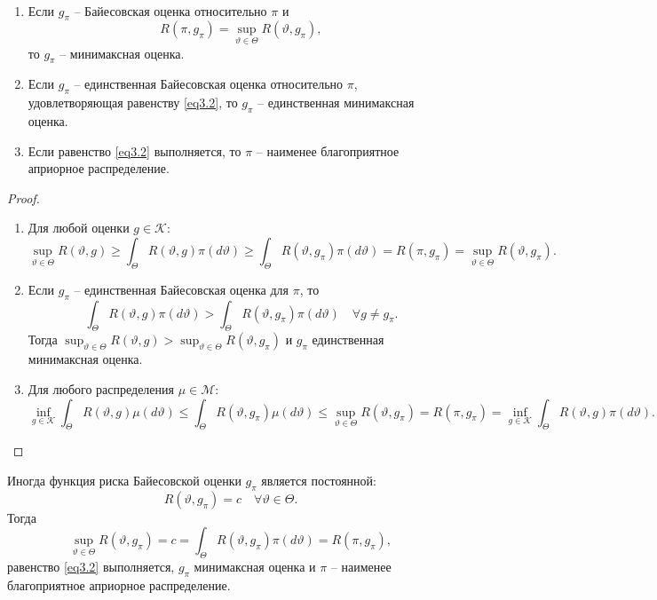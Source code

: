 \begin{thm} \
	\begin{enumerate}
		\item Если $g_\pi$ -- Байесовская оценка относительно $\pi$ и 
		\begin{equation} \label{eq3.2}
		 R(\pi, g_\pi) = \sup_{\vartheta \in \Theta} R(\vartheta, g_\pi),
		\end{equation}
		то $g_\pi$ -- минимаксная оценка.
		\item Если $g_\pi$ -- единственная Байесовская оценка относительно $\pi$, удовлетворяющая равенству \eqref{eq3.2}, то $g_\pi$ -- единственная минимаксная оценка.
		\item Если равенство \eqref{eq3.2} выполняется, то $\pi$ -- наименее благоприятное априорное распределение.
	\end{enumerate}
\end{thm}

\begin{proof} \
	\begin{enumerate}
		\item Для любой оценки $g \in \mathcal{K}$:
		\[ \sup_{\vartheta \in \Theta}R(\vartheta, g) \geq \int_{\Theta}R(\vartheta, g)\pi(d\vartheta) \geq \int_{\Theta}R(\vartheta, g_\pi)\pi(d\vartheta)=R(\pi, g_\pi)=\sup_{\vartheta \in \Theta}R(\vartheta, g_\pi). \]
		\item Если $g_\pi$ -- единственная Байесовская оценка для $\pi$, то
		\[ \int_{\Theta} R(\vartheta, g)\pi(d\vartheta) > \int_{\Theta} R(\vartheta, g_\pi)\pi(d\vartheta) \quad \forall g \neq g_\pi. \]
		Тогда $\sup_{\vartheta \in \Theta}R(\vartheta, g) > \sup_{\vartheta \in \Theta}R(\vartheta, g_\pi) $ и $g_\pi$ единственная минимаксная оценка.
		\item Для любого распределения $\mu \in \mathcal{M}$:
		\[ \inf_{g \in \mathcal{K}} \int_{\Theta} R(\vartheta, g)\mu(d\vartheta) \leq \int_{\Theta}R(\vartheta, g_\pi)\mu(d\vartheta) \leq \sup_{\vartheta \in \Theta} R(\vartheta, g_\pi) = R(\pi, g_\pi) = \inf_{g \in \mathcal{K}} \int_{\Theta}R(\vartheta, g) \pi(d\vartheta). \]
	\end{enumerate}
\end{proof}

\begin{rmrk}
	Иногда функция риска Байесовской оценки $g_\pi$ является постоянной:
	\[ R(\vartheta, g_\pi) = c \quad \forall \vartheta \in \Theta. \]
	Тогда
	\[ \sup_{\vartheta \in \Theta} R(\vartheta, g_\pi) = c = \int_{\Theta} R(\vartheta, g_\pi) \pi(d\vartheta) = R(\pi, g_\pi), \]
	равенство \eqref{eq3.2} выполняется, $g_\pi$ минимаксная оценка и $\pi$ -- наименее благоприятное априорное распределение.
\end{rmrk}


